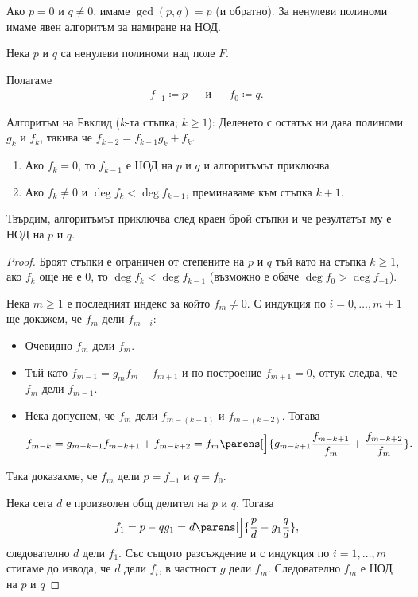 \documentclass{../../common/topic}
\begin{document}
Ако \( p = 0 \) и \( q \neq 0 \), имаме \( \gcd(p, q) = p \) (и обратно). За ненулеви полиноми имаме явен алгоритъм за намиране на НОД.
\begin{theorem}
  Нека \( p \) и \( q \) са ненулеви полиноми над поле \( F \).

  Полагаме
  \begin{align*}
     f_{-1} \coloneqq p
     &&\text{и}&&
     f_0 \coloneqq q.
  \end{align*}

  Алгоритъм на Евклид (\( k \)-та стъпка; \( k \geq 1 \)): Деленето с остатък ни дава полиноми \( g_k \) и \( f_k \), такива че \( f_{k-2} = f_{k-1} g_k + f_k \).
  \begin{enumerate}
    \item Ако \( f_k = 0 \), то \( f_{k-1} \) е НОД на \( p \) и \( q \) и алгоритъмът приключва.
    \item Ако \( f_k \neq 0 \) и \( \deg f_k < \deg f_{k-1} \), преминаваме към стъпка \( k + 1 \).
  \end{enumerate}

  Твърдим, алгоритъмът приключва след краен брой стъпки и че резултатът му е НОД на \( p \) и \( q \).
\end{theorem}
\begin{proof}
  Броят стъпки е ограничен от степените на \( p \) и \( q \) тъй като на стъпка \( k \geq 1 \), ако \( f_k \) още не е \( 0 \), то \( \deg f_k < \deg f_{k-1} \) (възможно е обаче \( \deg f_0 > \deg f_{-1} \)).

  Нека \( m \geq 1 \) е последният индекс за който \( f_m \neq 0 \). С индукция по \( i = 0, \ldots, m + 1 \) ще докажем, че \( f_m \) дели \( f_{m-i} \):
  \begin{itemize}
    \item Очевидно \( f_m \) дели \( f_m \).
    \item Тъй като \( f_{m-1} = g_m f_m + f_{m+1} \) и по построение \( f_{m+1} = 0 \), оттук следва, че \( f_m \) дели \( f_{m-1} \).
    \item Нека допуснем, че \( f_m \) дели \( f_{m-(k-1)} \) и \( f_{m-(k-2)} \). Тогава
    \begin{equation*}
      f_{m-k} = g_{m-k+1} f_{m-k+1} + f_{m-k+2} = f_m \parens[\Big]{ g_{m-k+1} \frac {f_{m-k+1}} {f_m} + \frac {f_{m-k+2}} {f_m} }.
    \end{equation*}
  \end{itemize}

  Така доказахме, че \( f_m \) дели \( p = f_{-1} \) и \( q = f_0 \).

  Нека сега \( d \) е произволен общ делител на \( p \) и \( q \). Тогава
  \begin{equation*}
    f_1 = p - q g_1 = d \parens[\Big]{ \frac p d - g_1 \frac q d },
  \end{equation*}
  следователно \( d \) дели \( f_1 \). Със същото разсъждение и с индукция по \( i = 1, \ldots, m \) стигаме до извода, че \( d \) дели \( f_i \), в частност \( g \) дели \( f_m \). Следователно \( f_m \) е НОД на \( p \) и \( q \)
\end{proof}
\end{document}
